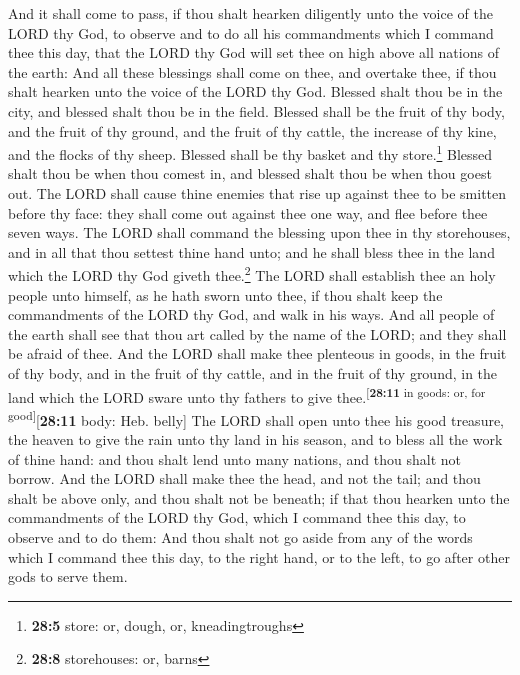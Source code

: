  And it shall come to pass, if thou shalt hearken
diligently unto the voice of the LORD thy God, to observe and to do all
his commandments which I command thee this day, that the LORD thy God
will set thee on high above all nations of the earth:  And
all these blessings shall come on thee, and overtake thee, if thou shalt
hearken unto the voice of the LORD thy God.  Blessed shalt
thou be in the city, and blessed shalt thou be in the field.
 Blessed shall be the fruit of thy body, and the fruit of
thy ground, and the fruit of thy cattle, the increase of thy kine, and
the flocks of thy sheep.  Blessed shall be thy basket and
thy store.\footnote{\textbf{28:5} store: or, dough, or, kneadingtroughs}
 Blessed shalt thou be when thou comest in, and blessed
shalt thou be when thou goest out.  The LORD shall cause
thine enemies that rise up against thee to be smitten before thy face:
they shall come out against thee one way, and flee before thee seven
ways.  The LORD shall command the blessing upon thee in
thy storehouses, and in all that thou settest thine hand unto; and he
shall bless thee in the land which the LORD thy God giveth
thee.\footnote{\textbf{28:8} storehouses: or, barns}  The
LORD shall establish thee an holy people unto himself, as he hath sworn
unto thee, if thou shalt keep the commandments of the LORD thy God, and
walk in his ways.  And all people of the earth shall see
that thou art called by the name of the LORD; and they shall be afraid
of thee.  And the LORD shall make thee plenteous in
goods, in the fruit of thy body, and in the fruit of thy cattle, and in
the fruit of thy ground, in the land which the LORD sware unto thy
fathers to give thee.\textsuperscript{{[}\textbf{28:11} in goods: or,
for good{]}}{[}\textbf{28:11} body: Heb. belly{]}  The
LORD shall open unto thee his good treasure, the heaven to give the rain
unto thy land in his season, and to bless all the work of thine hand:
and thou shalt lend unto many nations, and thou shalt not borrow.
 And the LORD shall make thee the head, and not the tail;
and thou shalt be above only, and thou shalt not be beneath; if that
thou hearken unto the commandments of the LORD thy God, which I command
thee this day, to observe and to do them:  And thou shalt
not go aside from any of the words which I command thee this day, to the
right hand, or to the left, to go after other gods to serve them.

